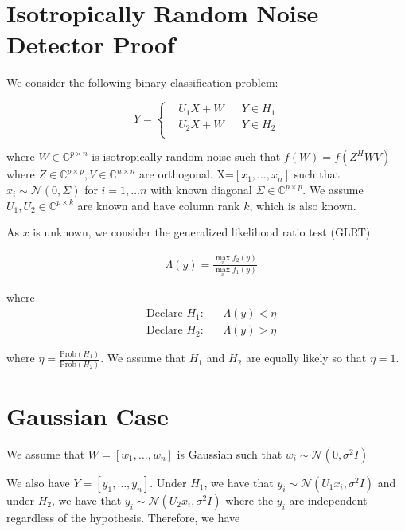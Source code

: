 \documentclass[english]{article}
\begin{document}
\section*{Isotropically Random Noise Detector Proof}

We consider the following binary classification problem:

\begin{equation}
Y=\left\{
\begin{aligned}
&U_1X+W
&& Y\in H_1\\
&U_2X+W
&& Y\in H_2\\
\end{aligned}\right.
\end{equation}

where $W\in\mathbb{C}^{p\times n}$ is isotropically random noise such that $f(W) = f(Z^HWV)$ where $Z\in\mathbb{C}^{p\times p}, V\in\mathbb{C}^{n\times n}$ are orthogonal. X=$\left[x_1,\dots,x_n\right]$ such that $x_i\sim\mathcal{N}(0,\Sigma)$ for $i=1,\dots n$ with known diagonal $\Sigma\in\mathbb{C}^{p\times p}$. We assume $U_1,U_2\in\mathbb{C}^{p\times k}$ are known and have column rank $k$, which is also known.

As $x$ is unknown, we consider the generalized likelihood ratio test (GLRT)

\begin{equation}\label{eq:glrt}
\begin{aligned}
&\Lambda(y)=\frac{\max_xf_2(y)}{\max_xf_1(y)}
\end{aligned}
\end{equation}

where
\begin{equation}
\begin{aligned}
&\text{Declare } H_1:
&& \Lambda(y) < \eta\\
& \text{Declare } H_2:
&& \Lambda(y) > \eta
\end{aligned}
\end{equation}

where $\eta = \frac{\text{Prob}(H_1)}{\text{Prob}(H_2)}$. We assume that $H_1$ and $H_2$ are equally likely so that $\eta = 1$.

\section*{Gaussian Case}

We assume that $W=\left[w_1,\dots,w_n\right]$ is Gaussian such that $w_i\sim\mathcal{N}(0,\sigma^2 I)$

We also have $Y=\left[y_1,\dots,y_n\right]$. Under $H_1$, we have that $y_i\sim\mathcal{N}(U_1x_i,\sigma^2I)$ and under $H_2$, we have that $y_i\sim\mathcal{N}(U_2x_i,\sigma^2I)$ where the $y_i$ are independent regardless of the hypothesis. Therefore, we have
\end{document}
